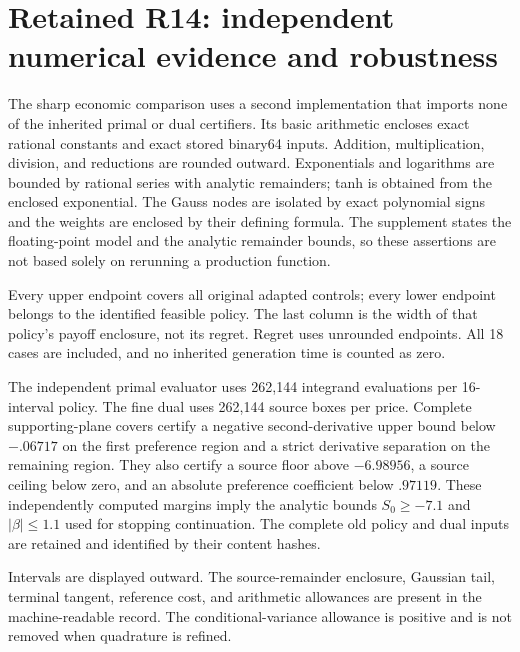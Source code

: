 \section{Retained R14: independent numerical evidence and robustness}\label{sec:independence}
The sharp economic comparison uses a second implementation that imports none of the inherited primal or dual certifiers. Its basic arithmetic encloses exact rational constants and exact stored binary64 inputs. Addition, multiplication, division, and reductions are rounded outward. Exponentials and logarithms are bounded by rational series with analytic remainders; tanh is obtained from the enclosed exponential. The Gauss nodes are isolated by exact polynomial signs and the weights are enclosed by their defining formula. The supplement states the floating-point model and the analytic remainder bounds, so these assertions are not based solely on rerunning a production function.

\begin{table}[t]\centering\small
\caption{Independent central-state certificates for all retained prices}\label{tab:nodes}

\par\smallskip\footnotesize Every upper endpoint covers all original adapted controls; every lower endpoint belongs to the identified feasible policy. The last column is the width of that policy's payoff enclosure, not its regret. Regret uses unrounded endpoints. All 18 cases are included, and no inherited generation time is counted as zero.
\end{table}

The independent primal evaluator uses 262,144 integrand evaluations per 16-interval policy. The fine dual uses 262,144 source boxes per price. Complete supporting-plane covers certify a negative second-derivative upper bound below $-.06717$ on the first preference region and a strict derivative separation on the remaining region. They also certify a source floor above $-6.98956$, a source ceiling below zero, and an absolute preference coefficient below $.97119$. These independently computed margins imply the analytic bounds $S_0\geq-7.1$ and $|\beta|\leq1.1$ used for stopping continuation. The complete old policy and dual inputs are retained and identified by their content hashes.

\begin{table}[t]\centering\small
\caption{Separate quantities in the independent $k=4.25$ calculation}\label{tab:dualbudget}

\par\smallskip\footnotesize Intervals are displayed outward. The source-remainder enclosure, Gaussian tail, terminal tangent, reference cost, and arithmetic allowances are present in the machine-readable record. The conditional-variance allowance is positive and is not removed when quadrature is refined.
\end{table}

